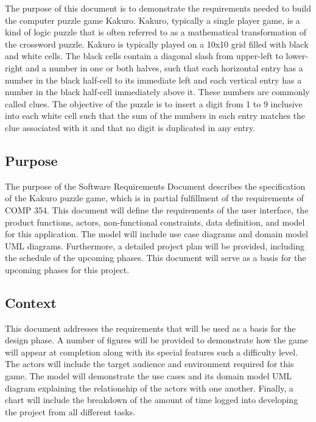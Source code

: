 \documentclass[12pt]{article}
\begin{document}
\hspace{\parindent} The purpose of this document is to demonstrate the requirements needed to build the computer puzzle game Kakuro. Kakuro, typically a single player game, is a kind of logic puzzle that is often referred to as a mathematical transformation of the crossword puzzle. Kakuro is typically played on a 10x10 grid filled with black and white cells. The black cells contain a diagonal slash from upper-left to lower-right and a number in one or both halves, such that each horizontal entry has a number in the black half-cell to its immediate left and each vertical entry has a number in the black half-cell immediately above it. These numbers are commonly called clues. The objective of the puzzle is to insert a digit from 1 to 9 inclusive into each white cell such that the sum of the numbers in each entry matches the clue associated with it and that no digit is duplicated in any entry. 

\subsection{Purpose}

\hspace{\parindent} The purpose of the Software Requirements Document describes the specification of the Kakuro puzzle game, which is in partial fulfillment of the requirements of COMP 354. This document will define the requirements of the user interface, the product functions, actors, non-functional constraints, data definition, and model for this application. The model will include use case diagrams and domain model UML diagrams. Furthermore, a detailed project plan will be provided, including the schedule of the upcoming phases. This document will serve as a basis for the upcoming phases for this project. 

\subsection{Context}

\hspace{\parindent} This document addresses the requirements that will be used as a basis for the design phase. A number of figures will be provided to demonstrate how the game will appear at completion along with its special features such a difficulty level. The actors will include the target audience and environment required for this game. The model will demonstrate the use cases and its domain model UML diagram explaining the relationship of the actors with one another. Finally, a chart will include the breakdown of the amount of time logged into developing the project from all different tasks. 
\end{document}
